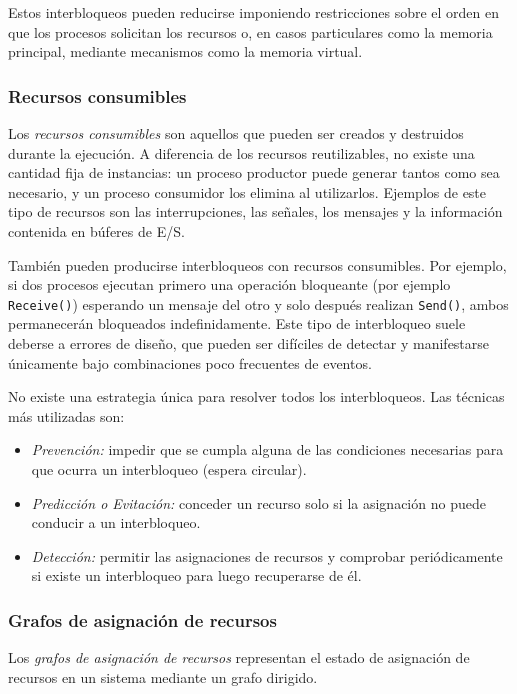 Estos interbloqueos pueden reducirse imponiendo restricciones sobre el orden en que los procesos solicitan los recursos o, en casos particulares como la memoria principal, mediante mecanismos como la memoria virtual.

\subsubsection{Recursos consumibles}

Los \textit{recursos consumibles} son aquellos que pueden ser creados y destruidos durante la ejecución. A diferencia de los recursos reutilizables, no existe una cantidad fija de instancias: un proceso productor puede generar tantos como sea necesario, y un proceso consumidor los elimina al utilizarlos. Ejemplos de este tipo de recursos son las interrupciones, las señales, los mensajes y la información contenida en búferes de E/S.

También pueden producirse interbloqueos con recursos consumibles. Por ejemplo, si dos procesos ejecutan primero una operación bloqueante (por ejemplo \texttt{Receive()}) esperando un mensaje del otro y solo después realizan \texttt{Send()}, ambos permanecerán bloqueados indefinidamente. Este tipo de interbloqueo suele deberse a errores de diseño, que pueden ser difíciles de detectar y manifestarse únicamente bajo combinaciones poco frecuentes de eventos.

No existe una estrategia única para resolver todos los interbloqueos. Las técnicas más utilizadas son:
\begin{itemize}
  \item \textit{Prevención:} impedir que se cumpla alguna de las condiciones necesarias para que ocurra un interbloqueo (espera circular).
  \item \textit{Predicción o Evitación:} conceder un recurso solo si la asignación no puede conducir a un interbloqueo.
  \item \textit{Detección:} permitir las asignaciones de recursos y comprobar periódicamente si existe un interbloqueo para luego recuperarse de él.
\end{itemize}

\subsubsection{Grafos de asignación de recursos}

Los \textit{grafos de asignación de recursos} representan el estado de asignación de recursos en un sistema mediante un grafo dirigido.

